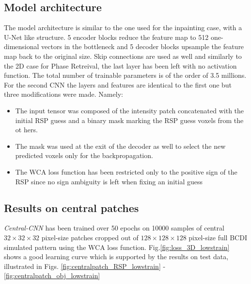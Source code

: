 \subsection{Model architecture}\label{chp:3d_patch_model} 
The model architecture is similar to the one used for the inpainting case, with a U-Net like structure. 
5 encoder blocks reduce the feature map to 512 one-dimensional vectors in the bottleneck and 5 decoder blocks upsample 
the feature map back to the original size. Skip connections are used as well and similarly to the 2D case for Phase Retreival, 
the last layer has been left with no activation function. The total number of trainable parameters is of the order of 3.5 millions. \\
For the second CNN the layers and features are identical to the first one but three modifications were made. Namely:
\begin{itemize}
    \item The input tensor was composed of the intensity patch concatenated with the initial RSP guess and a binary 
    mask marking the RSP guess voxels from the ot hers.
    \item The mask was used at the exit of the decoder as well to 
    select the new predicted voxels only for the backpropagation. 
    \item The WCA loss function has been restricted only to the positive sign of the RSP since no sign ambiguity is left 
    when fixing an initial guess
\end{itemize}

\subsection{Results on central patches}

\textit{Central-CNN} has been trained over 50 epochs on 10000 samples of central $32\times32\times32$ pixel-size patches 
cropped out of $128\times128\times128$ pixel-size full BCDI simulated pattern using the WCA loss function. 
Fig.\ref{fig:loss_3D_lowstrain} shows a good learning curve which is supported by the results on test data, illustrated 
in Figs. \ref{fig:centralpatch_RSP_lowstrain} - \ref{fig:centralpatch_obj_lowstrain}

